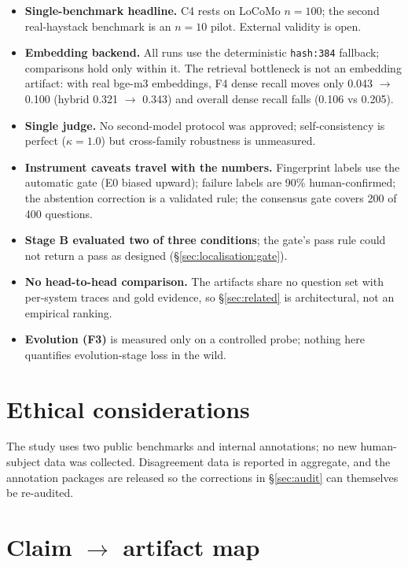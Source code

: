 \documentclass[11pt]{article}
\begin{document}
\begin{itemize}
\item \textbf{Single-benchmark headline.} C4 rests on LoCoMo $n{=}100$; the
second real-haystack benchmark is an $n{=}10$ pilot. External validity is
open.
\item \textbf{Embedding backend.} All runs use the deterministic
\texttt{hash:384} fallback; comparisons hold only within it. The retrieval
bottleneck is not an embedding artifact: with real bge-m3 embeddings, F4 dense
recall moves only 0.043 $\to$ 0.100 (hybrid 0.321 $\to$ 0.343) and overall
dense recall falls (0.106 vs 0.205).
\item \textbf{Single judge.} No second-model protocol was approved;
self-consistency is perfect ($\kappa = 1.0$) but cross-family robustness is
unmeasured.
\item \textbf{Instrument caveats travel with the numbers.} Fingerprint labels
use the automatic gate (E0 biased upward); failure labels are 90\%
human-confirmed; the abstention correction is a validated rule; the consensus
gate covers 200 of 400 questions.
\item \textbf{Stage B evaluated two of three conditions}; the gate's pass rule
could not return a pass as designed
(\S\ref{sec:localisation:gate}).
\item \textbf{No head-to-head comparison.} The artifacts share no question set
with per-system traces and gold evidence, so \S\ref{sec:related} is
architectural, not an empirical ranking.
\item \textbf{Evolution (F3)} is measured only on a controlled probe; nothing
here quantifies evolution-stage loss in the wild.
\end{itemize}

\section*{Ethical considerations}

The study uses two public benchmarks and internal annotations; no new
human-subject data was collected. Disagreement data is reported in aggregate,
and the annotation packages are released so the corrections in
\S\ref{sec:audit} can themselves be re-audited.



\appendix

\section{Claim $\to$ artifact map}
\label{app:map}
\end{document}
